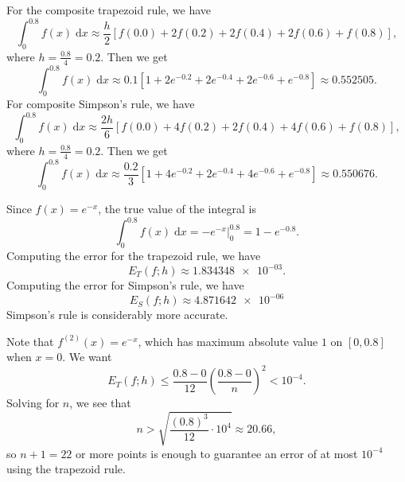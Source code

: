 \documentclass{homework}
\begin{document}
	\question
	\begin{alphaparts}
		\questionpart For the composite trapezoid rule, we have
		\begin{equation*}
			\int_0^{0.8}f(x)\;\text{d}x \approx \frac{h}{2}\left[f(0.0) + 2f(0.2) + 2f(0.4) + 2f(0.6) + f(0.8)\right],
		\end{equation*}
		where $h = \frac{0.8}{4} = 0.2$. Then we get
		\begin{equation*}
			\int_0^{0.8}f(x)\;\text{d}x \approx 0.1\left[1 +2 e^{-0.2} + 2e^{-0.4} + 2e^{-0.6} + e^{-0.8}\right] \approx \num{0.552505}.
		\end{equation*}
		\questionpart For composite Simpson's rule, we have
		\begin{equation*}
			\int_0^{0.8}f(x)\;\text{d}x \approx  \frac{2h}{6}\left[f(0.0) + 4f(0.2) + 2f(0.4) + 4f(0.6) + f(0.8)\right],
		\end{equation*}
		where $h = \frac{0.8}{4} = 0.2$. Then we get
		\begin{equation*}
			\int_0^{0.8}f(x)\;\text{d}x \approx \frac{0.2}{3}\left[1 + 4e^{-0.2} + 2e^{-0.4} + 4e^{-0.6} + e^{-0.8}\right] \approx \num{0.550676}.
		\end{equation*}
		
		\questionpart Since $f(x) = e^{-x}$, the true value of the integral is
		\begin{equation*}
			\int_0^{0.8}f(x)\;\text{d}x = -e^{-x}\big|_{0}^{0.8} = 1 -e^{-0.8}.
		\end{equation*}
		Computing the error for the trapezoid rule, we have
		\begin{equation*}
			E_T(f;h) \approx \num{1.834348e-03}.
		\end{equation*}
		Computing the error for Simpson's rule, we have
		\begin{equation*}
			E_S(f;h) \approx \num{4.871642e-06}
		\end{equation*}
		Simpson's rule is considerably more accurate.
		
		\questionpart Note that $f^{(2)}(x) = e^{-x}$, which has maximum absolute value $1$ on $[0,0.8]$ when $x =0$. We want
		\begin{equation*}
			E_T(f;h) \le \frac{0.8 - 0}{12}\left(\frac{0.8 - 0}{n}\right)^2 < 10^{-4}.
		\end{equation*}
		Solving for $n$, we see that
		\begin{equation*}
			n > \sqrt{\frac{(0.8)^3}{12}\cdot10^4} \approx 20.66,
		\end{equation*}
		so $n+1 =22$ or more points is enough to guarantee an error of at most $10^{-4}$ using the trapezoid rule.
		

\end{alphaparts}
\end{document}
